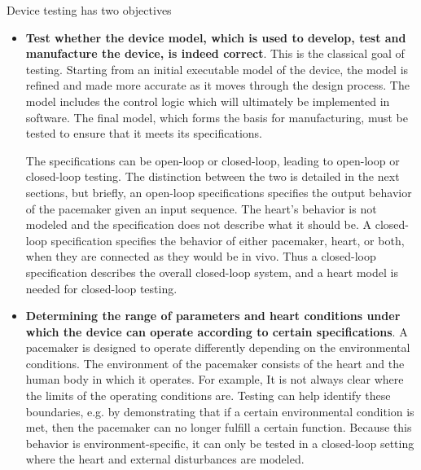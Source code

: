 Device testing has two objectives

\begin{itemize}
	\item \textbf{Test whether the device model, which is used to develop, test and manufacture the device, is indeed correct}.
	This is the classical goal of testing.
	Starting from an initial executable model of the device, the model is refined and made more accurate as it moves through the design process. 
	The model includes the control logic which will ultimately be implemented in software.
	The final model, which forms the basis for manufacturing, must be tested to ensure that it meets its specifications.
	
	The specifications can be open-loop or closed-loop, leading to open-loop or closed-loop testing.
	The distinction between the two is detailed in the next sections, but briefly, an open-loop specifications specifies the output behavior of the pacemaker given an input sequence.
	The heart's behavior is not modeled and the specification does not describe what it should be.
	A closed-loop specification specifies the behavior of either pacemaker, heart, or both, when they are connected as they would be in vivo.
	Thus a closed-loop specification describes the overall closed-loop system, and a heart model is needed for closed-loop testing.
	\item \textbf{Determining the range of parameters and heart conditions under which the device can operate according to certain specifications}.
	A pacemaker is designed to operate differently depending on the environmental conditions. 
	The environment of the pacemaker consists of the heart and the human body in which it operates. 
	For example, 
	It is not always clear where the limits of the operating conditions are.
	Testing can help identify these boundaries, e.g. by demonstrating that if a certain environmental condition is met, then the pacemaker can no longer fulfill a certain function.
	Because this behavior is environment-specific, it can only be tested in a closed-loop setting where the heart and external disturbances are modeled.
\end{itemize}
